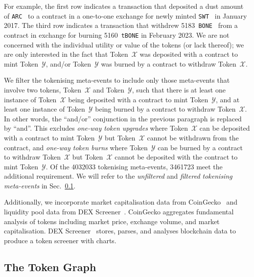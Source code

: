 For example, the first row indicates a transaction that deposited a
dust amount of \texttt{ARC}~\cite{arcade-city-xx} to a contract in a
one-to-one exchange for newly minted \texttt{SWT}~\cite{swarm-city-xx}
in January 2017.  The third row indicates a transaction that withdrew
\num{5183}~\texttt{BONE}~\cite{shiba-inu-xx} from a contract in
exchange for burning \num{5160}~\texttt{tBONE} in February 2023.  We
are not concerned with the individual utility or value of the tokens
(or lack thereof); we are only interested in the fact that
Token~$\mathcal{X}$ was deposited with a contract to mint
Token~$\mathcal{Y}$, and/or Token~$\mathcal{Y}$ was burned by a
contract to withdraw Token~$\mathcal{X}$.

We filter the tokenising meta-events to include only those meta-events
that involve two tokens, Token~$\mathcal{X}$ and Token~$\mathcal{Y}$,
such that there is at least one instance of Token~$\mathcal{X}$ being
deposited with a contract to mint Token~$\mathcal{Y}$, and at least
one instance of Token~$\mathcal{Y}$ being burned by a contract to
withdraw Token~$\mathcal{X}$.  In other words, the ``and/or''
conjunction in the previous paragraph is replaced by ``and''.  This
excludes \textit{one-way token upgrades} where Token~$\mathcal{X}$ can
be deposited with a contract to mint Token~$\mathcal{Y}$ but
Token~$\mathcal{X}$ cannot be withdrawn from the contract, and
\textit{one-way token burns} where Token~$\mathcal{Y}$ can be burned
by a contract to withdraw Token~$\mathcal{X}$ but Token~$\mathcal{X}$
cannot be deposited with the contract to mint Token~$\mathcal{Y}$.  Of
the \num{4032033} tokenising meta-events, \num{3461723} meet the
additional requirement.  We will refer to the \textit{unfiltered} and
\textit{filtered tokenising meta-events} in
Sec.~\ref{sec:token-comp-token-graph}.

Additionally, we incorporate market capitalisation data from
CoinGecko~\cite{gecko-labs-xx} and liquidity pool data from DEX
Screener~\cite{dex-screener-xx}.  CoinGecko aggregates fundamental
analysis of tokens including market price, exchange volume, and market
capitalisation. DEX Screener~\cite{dex-screener-xx} stores, parses,
and analyses blockchain data to produce a token screener with charts.

\subsection{The Token Graph}\label{sec:token-comp-token-graph}

